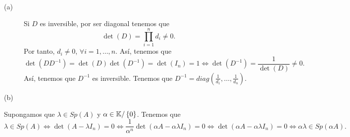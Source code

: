 \documentclass{article}
\begin{document}
\begin{ej}
\begin{description}
\item[(a)] Si $\displaystyle D $ es inversible, por ser diagonal tenemos que 
\[\det\left(D\right) = \prod^{n}_{i = 1}d _{i} \neq 0.\]
Por tanto, $\displaystyle d _{i} \neq 0 $, $\displaystyle \forall i = 1, \ldots, n $. Así, tenemos que 
\[\det\left(D D^{-1}\right) = \det\left(D\right) \det\left(D^{-1}\right) = \det\left(I_{n}\right) = 1 \iff \det\left(D^{-1}\right) = \frac{1}{\det\left(D\right)} \neq 0 .\]
Así, tenemos que $\displaystyle D^{-1} $ es inversible. Tenemos que $\displaystyle D^{-1} = diag\left(\frac{1}{d _{1}}, \ldots, \frac{1}{d _{n}}\right) $.
\item[(b)] 
\end{description}
\end{ej}

\begin{ej}
	Supongamos que $\displaystyle \lambda \in Sp\left(A\right) $ y $\displaystyle \alpha \in \mathbb{K}/ \left\{ 0\right\}  $. Tenemos que 
	\[\lambda \in Sp\left(A\right) \iff \det\left(A - \lambda I_{n}\right) = 0 \iff \frac{1}{\alpha ^{n}}\det\left(\alpha A - \alpha \lambda I_{n}\right) = 0 \iff \det\left(\alpha A - \alpha \lambda I_{n}\right) = 0 \iff \alpha \lambda \in Sp\left(\alpha A\right) .\]
\end{ej}
\end{document}
